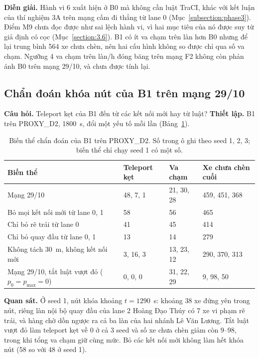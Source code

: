 \documentclass[../main.tex]{subfiles}
\begin{document}
\textbf{Diễn giải.} Hành vi 6 xuất hiện ở B0 mà không cần luật TraCI, khác với kết luận của thí nghiệm 3A trên mạng cấm đi thẳng từ lane 0 (Mục~\ref{subsection:phase3}). Điểm M9 chưa đọc được như sai lệch hành vi, vì hai mục tiêu của nó được suy từ giả định có cọc (Mục~\ref{section:3.6}). B1 có ít va chạm trên làn hơn B0 nhưng để lại trung bình 564 xe chưa chèn, nên hai cấu hình không so được chỉ qua số va chạm. Ngưỡng 4 va chạm trên làn/h đóng băng trên mạng F2 không còn phản ánh B0 trên mạng 29/10, và chưa được tính lại.

\subsection{Chẩn đoán khóa nút của B1 trên mạng 29/10}
\label{subsection:gridlock}

\textbf{Câu hỏi.} Teleport kẹt của B1 đến từ các kết nối mới hay từ luật? \textbf{Thiết lập.} B1 trên PROXY\_D2, 1800~s, đổi một yếu tố mỗi lần (Bảng~\ref{table:4.gridlock}).

\begin{table}[H]
\centering
\small
\caption{Biến thể chẩn đoán của B1 trên PROXY\_D2. Số trong ô ghi theo seed 1, 2, 3; biến thể chỉ chạy seed 1 có một số.} \label{table:4.gridlock}
\begin{tabular}{|p{6.4cm}|p{2.2cm}|p{2.2cm}|p{2.4cm}|}
\hline
\textbf{Biến thể} & \textbf{Teleport kẹt} & \textbf{Va chạm} & \textbf{Xe chưa chèn cuối} \\ \hline
Mạng 29/10 & 48, 7, 1 & 21, 30, 28 & 459, 451, 368 \\ \hline
Bỏ mọi kết nối mới từ lane 0, 1 & 58 & 56 & 465 \\ \hline
Chỉ bỏ rẽ trái từ lane 0 & 41 & 45 & 414 \\ \hline
Chỉ bỏ quay đầu từ lane 0, 1 & 13 & 14 & 279 \\ \hline
Không tách 30~m, không kết nối mới & 3, 16, 3 & 13, 23, 12 & 290, 370, 313 \\ \hline
Mạng 29/10, tắt luật vượt đỏ ($p_0 = p_{\max} = 0$) & 0, 0, 0 & 31, 22, 29 & 9, 98, 50 \\ \hline
\end{tabular}
\end{table}

\textbf{Quan sát.} Ở seed 1, nút khóa khoảng $t = 1290$~s: khoảng 38 xe đứng yên trong nút, riêng làn nội bộ quay đầu của lane 2 Hoàng Đạo Thúy có 7 xe vi phạm rẽ trái, và hàng chờ dồn ngược ra cả ba làn của hai nhánh Lê Văn Lương. Tắt luật vượt đỏ làm teleport kẹt về 0 ở cả 3 seed và số xe chưa chèn giảm còn 9--98, trong khi tổng va chạm giữ cùng mức. Bỏ các kết nối mới không làm hết khóa nút (58 so với 48 ở seed 1).
\end{document}
